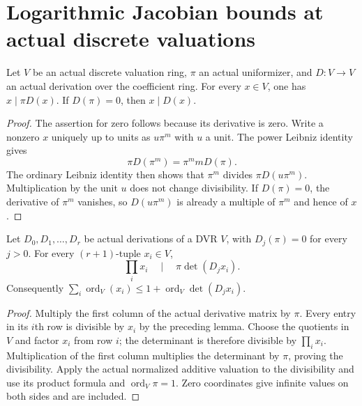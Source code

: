 \section{Logarithmic Jacobian bounds at actual discrete valuations}

\begin{lemma}\label{lem:sc0-dvr-logarithmic-derivative}
\leanok
Let $V$ be an actual discrete valuation ring, $\pi$ an actual uniformizer,
and $D:V\to V$ an actual derivation over the coefficient ring. For every
$x\in V$, one has $x\mid\pi D(x)$. If $D(\pi)=0$, then $x\mid D(x)$.
\end{lemma}
\begin{proof}
The assertion for zero follows because its derivative is zero. Write a
nonzero $x$ uniquely up to units as $u\pi^m$ with $u$ a unit. The power
Leibniz identity gives
\[
 \pi D(\pi^m)=\pi^m mD(\pi).
\]
The ordinary Leibniz identity then shows that $\pi^m$ divides
$\pi D(u\pi^m)$. Multiplication by the unit $u$ does not change divisibility.
If $D(\pi)=0$, the derivative of $\pi^m$ vanishes, so $D(u\pi^m)$ is already
a multiple of $\pi^m$ and hence of $x$.
\end{proof}

\begin{lemma}\label{lem:sc0-dvr-logarithmic-determinant}
\leanok
{}
Let $D_0,D_1,\ldots,D_r$ be actual derivations of a DVR $V$, with
$D_j(\pi)=0$ for every $j>0$. For every $(r+1)$-tuple $x_i\in V$,
\[
 \prod_i x_i \quad\mid\quad \pi\det(D_jx_i).
\]
Consequently $\sum_i\operatorname{ord}_V(x_i)\le
1+\operatorname{ord}_V\det(D_jx_i)$.
\end{lemma}
\begin{proof}
Multiply the first column of the actual derivative matrix by $\pi$. Every
entry in its $i$th row is divisible by $x_i$ by the preceding lemma.
Choose the quotients in $V$ and factor $x_i$ from row $i$; the determinant
is therefore divisible by $\prod_i x_i$. Multiplication of the first column
multiplies the determinant by $\pi$, proving the divisibility. Apply the
actual normalized additive valuation to the divisibility and use its product
formula and $\operatorname{ord}_V\pi=1$. Zero coordinates give infinite values
on both sides and are included.
\end{proof}

